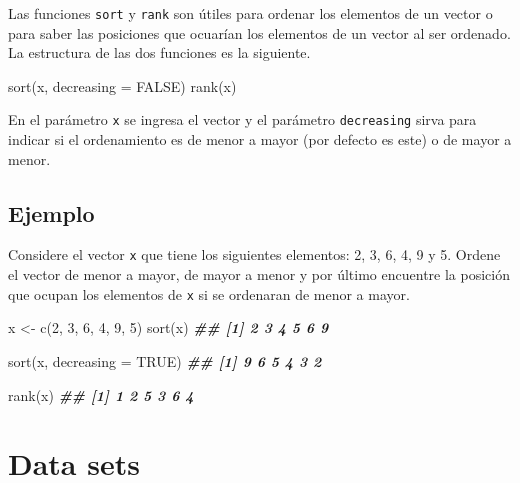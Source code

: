 \documentclass[
]{book}
\newenvironment{Shaded}{\begin{snugshade}}{\end{snugshade}}
\newcommand{\AttributeTok}[1]{\textcolor[rgb]{0.77,0.63,0.00}{#1}}
\newcommand{\ConstantTok}[1]{\textcolor[rgb]{0.00,0.00,0.00}{#1}}
\newcommand{\DecValTok}[1]{\textcolor[rgb]{0.00,0.00,0.81}{#1}}
\newcommand{\DocumentationTok}[1]{\textcolor[rgb]{0.56,0.35,0.01}{\textbf{\textit{#1}}}}
\newcommand{\FunctionTok}[1]{\textcolor[rgb]{0.00,0.00,0.00}{#1}}
\newcommand{\NormalTok}[1]{#1}
\newcommand{\OtherTok}[1]{\textcolor[rgb]{0.56,0.35,0.01}{#1}}
\begin{document}
Las funciones \texttt{sort} y \texttt{rank} son útiles para ordenar los elementos de un vector o para saber las posiciones que ocuarían los elementos de un vector al ser ordenado. La estructura de las dos funciones es la siguiente.

\begin{Shaded}
\begin{Highlighting}[]
\FunctionTok{sort}\NormalTok{(x, }\AttributeTok{decreasing =} \ConstantTok{FALSE}\NormalTok{)}
\FunctionTok{rank}\NormalTok{(x)}
\end{Highlighting}
\end{Shaded}

En el parámetro \texttt{x} se ingresa el vector y el parámetro \texttt{decreasing} sirva para indicar si el ordenamiento es de menor a mayor (por defecto es este) o de mayor a menor.

\hypertarget{ejemplo-14}{%
\subsection*{Ejemplo}\label{ejemplo-14}}

Considere el vector \texttt{x} que tiene los siguientes elementos: 2, 3, 6, 4, 9 y 5. Ordene el vector de menor a mayor, de mayor a menor y por último encuentre la posición que ocupan los elementos de \texttt{x} si se ordenaran de menor a mayor.

\begin{Shaded}
\begin{Highlighting}[]
\NormalTok{x }\OtherTok{\textless{}{-}} \FunctionTok{c}\NormalTok{(}\DecValTok{2}\NormalTok{, }\DecValTok{3}\NormalTok{, }\DecValTok{6}\NormalTok{, }\DecValTok{4}\NormalTok{, }\DecValTok{9}\NormalTok{, }\DecValTok{5}\NormalTok{)}
\FunctionTok{sort}\NormalTok{(x)}
\DocumentationTok{\#\# [1] 2 3 4 5 6 9}

\FunctionTok{sort}\NormalTok{(x, }\AttributeTok{decreasing =} \ConstantTok{TRUE}\NormalTok{)}
\DocumentationTok{\#\# [1] 9 6 5 4 3 2}

\FunctionTok{rank}\NormalTok{(x)}
\DocumentationTok{\#\# [1] 1 2 5 3 6 4}
\end{Highlighting}
\end{Shaded}

\hypertarget{data-sets}{%
\section{Data sets}\label{data-sets}}
\end{document}
